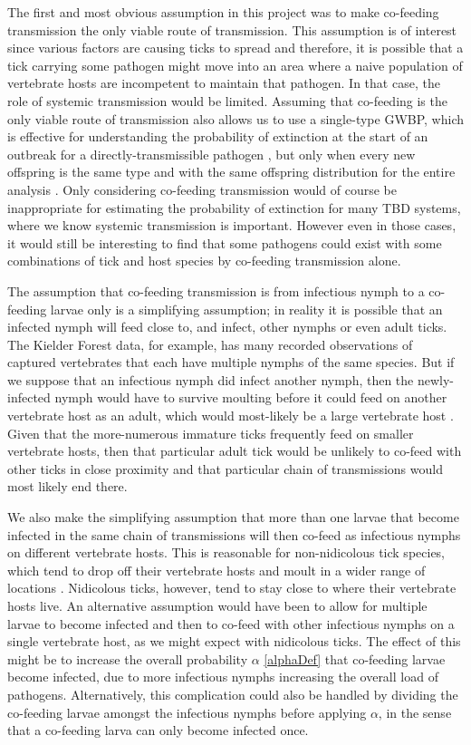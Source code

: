 \documentclass[hidelinks]{article}
\begin{document}
The first and most obvious assumption in this project was to make co-feeding transmission the only viable route of transmission. This assumption is of interest since various factors are causing ticks to spread \citep{Medlock2013, Alkishe_2017, Cunze_2022} and therefore, it is possible that a tick carrying some pathogen might move into an area where a naive population of vertebrate hosts are incompetent to maintain that pathogen. In that case, the role of systemic transmission would be limited. Assuming that co-feeding is the only viable route of transmission also allows us to use a single-type GWBP, which is effective for understanding the probability of extinction at the start of an outbreak for a directly-transmissible pathogen \citep{LloydSmith2005}, but only when every new offspring is the same type and with the same offspring distribution for the entire analysis \citep{Allen2019}. Only considering co-feeding transmission would of course be inappropriate for estimating the probability of extinction for many TBD systems, where we know systemic transmission is important. However even in those cases, it would still be interesting to find that some pathogens could exist with some combinations of tick and host species by co-feeding transmission alone.

The assumption that co-feeding transmission is from infectious nymph to a co-feeding larvae only is a simplifying assumption; in reality it is possible that an infected nymph will feed close to, and infect, other nymphs or even adult ticks. The Kielder Forest data, for example, has many recorded observations of captured vertebrates that each have multiple nymphs of the same species. But if we suppose that an infectious nymph did infect another nymph, then the newly-infected nymph would have to survive moulting before it could feed on another vertebrate host as an adult, which would most-likely be a large vertebrate host \citep{Randolph1998}. Given that the more-numerous immature ticks frequently feed on smaller vertebrate hosts, then that particular adult tick would be unlikely to co-feed with other ticks in close proximity and that particular chain of transmissions would most likely end there.

We also make the simplifying assumption that more than one larvae that become infected in the same chain of transmissions will then co-feed as infectious nymphs on different vertebrate hosts. This is reasonable for non-nidicolous tick species, which tend to drop off their vertebrate hosts and moult in a wider range of locations \citep{Nicholson2019}. Nidicolous ticks, however, tend to stay close to where their vertebrate hosts live. An alternative assumption would have been to allow for multiple larvae to become infected and then to co-feed with other infectious nymphs on a single vertebrate host, as we might expect with nidicolous ticks. The effect of this might be to increase the overall probability $ \alpha $ \eqref{alphaDef} that co-feeding larvae become infected, due to more infectious nymphs increasing the overall load of pathogens. Alternatively, this complication could also be handled by dividing the co-feeding larvae amongst the infectious nymphs before applying $ \alpha $, in the sense that a co-feeding larva can only become infected once.
\end{document}
